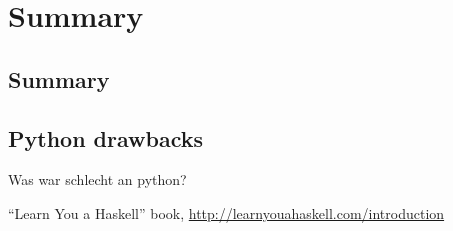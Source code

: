 \documentclass[a4paper,12pt]{report}
\theoremstyle{definition}
\begin{document}
\chapter{Summary}
\section{Summary}
\section{Python drawbacks}
Was war schlecht an python?
\begin{thebibliography}{999}
 "`Learn You a Haskell"' book, \url{http://learnyouahaskell.com/introduction}
\end{thebibliography}
\end{document}
